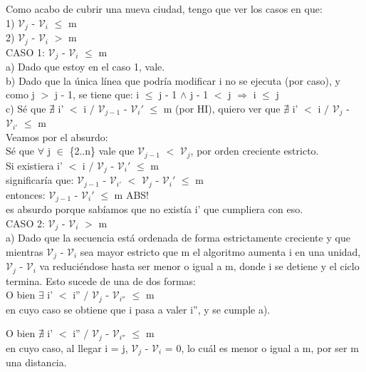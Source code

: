 \documentclass{article}
\theoremstyle{definition}
\theoremstyle{remark}
\begin{document}
Como acabo de cubrir una nueva ciudad, tengo que ver los casos en que:\\
1) $\mathcal{V}_j$ - $\mathcal{V}_i$ $\leq$ m \\
2) $\mathcal{V}_j$ - $\mathcal{V}_i$ $>$ m \\

CASO 1: $\mathcal{V}_j$ - $\mathcal{V}_i$ $\leq$ m \\
a) Dado que estoy en el caso 1, vale.\\
b) Dado que la única línea que podría modificar i no se ejecuta (por caso), y como j $>$ j - 1, se tiene que: i $\leq$ j - 1 $\wedge$ j - 1 $<$ j $\Rightarrow$ i $\leq$ j \\
c) Sé que $\nexists$ i' $<$ i $/$ $\mathcal{V}_{j-1}$ - $\mathcal{V}_i'$ $\leq$ m (por HI), quiero ver que $\nexists$ i' $<$ i $/$ $\mathcal{V}_j$ - $\mathcal{V}_{i'}$ $\leq$ m \\

Veamos por el absurdo: \\
Sé que $\forall$ j $\in$ \{2..n\} vale que $\mathcal{V}_{j-1}$ $<$ $\mathcal{V}_j$, por orden creciente estricto. \\
Si existiera i' $<$ i $/$ $\mathcal{V}_j$ - $\mathcal{V}_i'$ $\leq$ m \\
significaría que:  $\mathcal{V}_{j-1}$ - $\mathcal{V}_{i'}$ $<$ $\mathcal{V}_j$ - $\mathcal{V}_i'$ $\leq$ m \\
entonces: $\mathcal{V}_{j-1}$ - $\mathcal{V}_i'$ $\leq$ m   ABS! \\
es absurdo porque sabíamos que no existía i' que cumpliera con eso. \\

CASO 2: $\mathcal{V}_j$ - $\mathcal{V}_i$ $>$ m \\
a) Dado que la secuencia está ordenada de forma estrictamente creciente y que mientras $\mathcal{V}_j$ - $\mathcal{V}_i$ sea mayor estricto que m el algoritmo aumenta i en una unidad, $\mathcal{V}_j$ - $\mathcal{V}_i$ va reduciéndose hasta ser menor o igual a m, donde i se detiene y el ciclo termina. Esto sucede de una de dos formas: \\

O bien $\exists$ i' $<$ i'' $/$ $\mathcal{V}_j$ - $\mathcal{V}_{i''}$ $\leq$ m \\
en cuyo caso se obtiene que i pasa a valer i'', y se cumple a).

O bien $\nexists$ i' $<$ i'' $/$ $\mathcal{V}_j$ - $\mathcal{V}_{i''}$ $\leq$ m \\
en cuyo caso, al llegar i = j, $\mathcal{V}_j$ - $\mathcal{V}_i$ = 0, lo cuál es menor o igual a m, por ser m una distancia. \\
\end{document}
